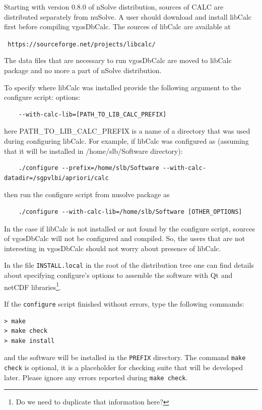 \documentclass [10pt,letterpaper]{report}
\newcommand{\nuSolve}{\greektext n\latintext Solve}
\begin{document}
{%
%
%
%
Starting with version 0.8.0 of \nuSolve{} distribution, sources of CALC are distributed separately
from nuSolve. A user should download and install libCalc first before compiling vgosDbCalc. The
sources of libCalc are available at
\begin{center}
{\tt
https://sourceforge.net/projects/libcalc/
}
\end{center}
The data files that are necessary to run vgosDbCalc are moved to libCalc package and no more
a part of \nuSolve{} distribution.

To specify where libCalc was installed
provide the following argument to the configure script:
options:
\begin{verbatim}
    --with-calc-lib=[PATH_TO_LIB_CALC_PREFIX]
\end{verbatim}
here PATH\_TO\_LIB\_CALC\_PREFIX is a name of a directory that was used during configuring libCalc.
For example, if libCalc was configured as (assuming that it will be installed in /home/slb/Software
directory):
\begin{verbatim}
    ./configure --prefix=/home/slb/Software --with-calc-datadir=/sgpvlbi/apriori/calc
\end{verbatim}
then run the configure script from nusolve package as
\begin{verbatim}
    ./configure --with-calc-lib=/home/slb/Software [OTHER_OPTIONS]
\end{verbatim}

In the case if libCalc is not installed or not found by the configure script, sources of
vgosDbCalc will not be configured and compiled. So, the users that are not interesting in
vgosDbCalc should not worry about presence of libCalc.


%
%
%
%
In the file {\tt INSTALL.local} in the root of the distribution tree one can
find details about specifying configure's options to assemble the software
with Qt and netCDF libraries\footnote{Do we need to duplicate that
information here?}.

If the {\tt configure} script finished without errors, type the
following commands:
\begin{verbatim}
> make
> make check
> make install
\end{verbatim}
\noindent


and the software will be installed in the {\tt PREFIX} directory. The
command {\tt make check} is optional, it is a placeholder for checking
suite that will be developed later. Please ignore any errors reported
during {\tt make check}.

}
\end{document}
